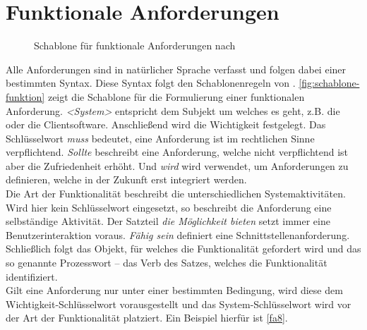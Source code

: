 \section{Funktionale Anforderungen}
\label{sec:funktionale}

\begin{figure}
    \centering
    
    \caption{Schablone für funktionale Anforderungen nach }
    \label{fig:schablone-funktion}
\end{figure}

Alle Anforderungen sind in natürlicher Sprache verfasst und folgen dabei einer bestimmten Syntax. Diese
Syntax folgt den Schablonenregeln von . \autoref{fig:schablone-funktion} zeigt die
Schablone für die Formulierung einer funktionalen Anforderung. \emph{<System>} entspricht dem 
Subjekt um welches
es geht, z.B. die \shst{} oder die Clientsoftware. Anschließend wird die Wichtigkeit festgelegt. Das 
Schlüsselwort \emph{muss} bedeutet, eine Anforderung ist im rechtlichen Sinne verpflichtend. \emph{Sollte} 
beschreibt eine Anforderung, welche nicht verpflichtend ist aber die Zufriedenheit erhöht. Und \emph{wird}
wird verwendet, um Anforderungen zu definieren, welche in der Zukunft erst integriert werden.\\
Die Art der Funktionalität beschreibt die unterschiedlichen Systemaktivitäten. Wird hier kein Schlüsselwort
eingesetzt, so beschreibt die Anforderung eine selbständige Aktivität. Der Satzteil \emph{die Möglichkeit bieten}
setzt immer eine Benutzerinteraktion voraus. \emph{Fähig sein} definiert eine Schnittstellenanforderung.\\
Schließlich folgt das Objekt, für welches die Funktionalität gefordert wird und das so genannte Prozesswort -- das
Verb des Satzes, welches die Funktionalität identifiziert.\\
Gilt eine Anforderung nur unter einer bestimmten Bedingung, wird diese dem Wichtigkeit-Schlüsselwort vorausgestellt und
das System-Schlüsselwort wird vor der Art der Funktionalität platziert. Ein Beispiel hierfür ist \ref{fa8}.

